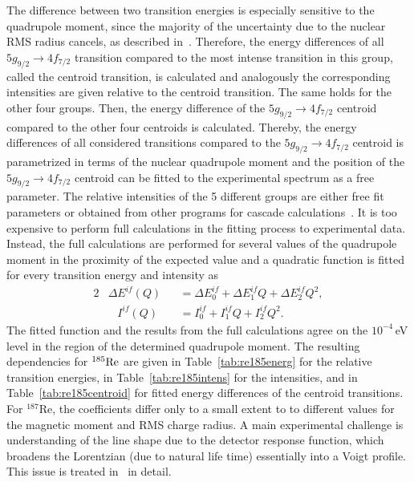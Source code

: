 The difference between two transition energies is especially sensitive to the quadrupole moment, since the majority of the uncertainty due to the nuclear RMS radius cancels, as described in~\cite{konijn1979}. Therefore, the energy differences of all $5g_{9/2}\rightarrow4f_{7/2}$ transition compared to the most intense transition in this group, called the centroid transition, is calculated and analogously the corresponding intensities are given relative to the centroid transition.
The same holds for the other four groups. Then, the energy difference of the $5g_{9/2}\rightarrow4f_{7/2}$ centroid compared to the other four centroids is calculated.
Thereby, the energy differences of all considered transitions compared to the $5g_{9/2}\rightarrow4f_{7/2}$ centroid is parametrized in terms of the nuclear quadrupole moment and the position of the $5g_{9/2}\rightarrow4f_{7/2}$ centroid can be fitted to the experimental spectrum as a free parameter. The relative intensities of the 5 different groups are either free fit parameters or obtained from other programs for cascade calculations~\cite{elisa_privcomm}.
It is too expensive to perform full calculations in the fitting process to experimental data. Instead, the full calculations are performed for several values of the quadrupole moment in the proximity of the expected value and a quadratic function is fitted for every transition energy and intensity as
\begin{alignat}{2}
&\Delta E^{if}(Q)&&= \Delta E^{if}_0 +  \Delta E^{if}_1 Q+  \Delta E^{if}_2 Q^2,\label{eq:en_fit}\\
&\phantom{\Delta}I^{if}(Q)&&= I^{if}_0 +  I^{if}_1 Q+  I^{if}_2 Q^2.\label{eq:tran_fit}
\end{alignat}
The fitted function and the results from the full calculations agree on the $10^{-4}\,$eV level in the region of the determined quadrupole moment. The resulting dependencies for $^{185}\rm{Re}$ are given in Table~\ref{tab:re185energ} for the relative transition energies, in Table~\ref{tab:re185intens} for the intensities, and in Table~\ref{tab:re185centroid} for fitted energy differences of the centroid transitions. For $^{187}$Re, the coefficients differ only to a small extent to to different values for the magnetic moment and RMS charge radius.
A main experimental challenge is understanding of the line shape due to the detector response function, which broadens the Lorentzian (due to natural life time) essentially into a Voigt profile. This issue is treated in~\cite{vogiatzi2018} in detail.

